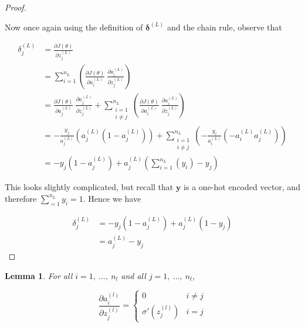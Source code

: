 \documentclass{article}[11pt]
\newtheorem{lemma}{Lemma}
\begin{document}
\begin{proof}
\begin{itemize}
            \end{itemize}
            
            Now once again using the definition of $\boldsymbol{\delta}^{(L)}$ and the chain rule, observe that
            
            $$ \begin{aligned}
            \delta^{(L)}_j &= \frac{\partial J(\theta)}{\partial z^{(L)}_j} \\
            &= \sum_{i=1}^{n_L} \left( \frac{\partial J(\theta)}{\partial a^{(L)}_i} \ \frac{\partial a^{(L)}_i}{\partial z^{(L)}_j} \right) \\
            &= \frac{\partial J(\theta)}{\partial a^{(L)}_j} \ \frac{\partial a^{(L)}_j}{\partial z^{(L)}_j} + \sum_{\substack{i=1 \\ i \neq j}}^{n_L} \left( \frac{\partial J(\theta)}{\partial a^{(L)}_i} \ \frac{\partial a^{(L)}_i}{\partial z^{(L)}_j} \right) \\
            &= - \frac{y_j}{a^{(L)}_j} \left( a^{(L)}_j (1 - a^{(L)}_j) \right) + \sum_{\substack{i=1 \\ i \neq j}}^{n_L} \left( - \frac{y_i}{a^{(L)}_i} \left(- a^{(L)}_i a^{(L)}_j \right) \right) \\
            &= - y_j (1 - a^{(L)}_j) + a^{(L)}_j \left( \sum_{i=1}^{n_L} \left( y_i \right) - y_j \right)
            \end{aligned} $$
            
            This looks slightly complicated, but recall that $\mathbf{y}$ is a one-hot encoded vector, and therefore $\sum_{=1}^{n_L} y_i = 1$. Hence we have
            
            $$ \begin{aligned}
            \delta^{(L)}_j &= - y_j (1 - a^{(L)}_j) + a^{(L)}_j (1 - y_j) \\
            &= a^{(L)}_j - y_j
            \end{aligned} $$
            
        \end{proof}
        
        
        \begin{lemma} For all $i = 1, \ \ldots, \ n_l$ and all $j = 1, \ \ldots, \ n_l$,
            
            $$
            \frac{\partial a^{(l)}_i}{\partial z^{(l)}_j} = \begin{cases}
                0 & i \neq j \\
                \sigma'(z^{(l)}_j) & i = j
            \end{cases}
            $$

        \end{lemma}
    
\end{document}
